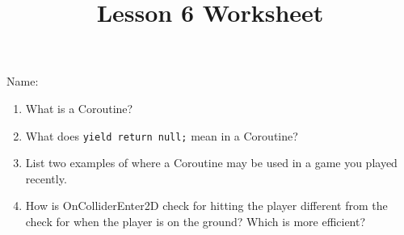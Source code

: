 \documentclass[12pt]{../rhitcsse}
\title{Lesson 6 Worksheet}
\begin{document}
\maketitle

\vspace*{0.15in}\hspace{0.25in}Name:\hrulefill\hspace{0.25in}\hspace{0.25in}

\begin{enumerate}
  \item What is a Coroutine?
  \vfill
  \item What does \texttt{yield return null;} mean in a Coroutine?
  \vfill 
  \item List two examples of where a Coroutine may be used in a game you played recently.
  \vfill
  \item How is OnColliderEnter2D check for hitting the player different from the check for 
  when the player is on the ground? Which is more efficient?
  \vfill

\end{enumerate}
\end{document}
